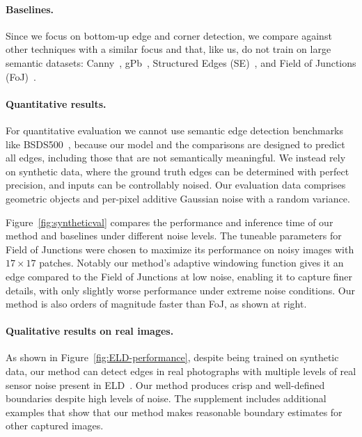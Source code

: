 \documentclass[main.tex]{subfiles}
\begin{document}
\vspace{-5pt}
\paragraph{Baselines.}

Since we focus on bottom-up edge and corner detection, we compare against other techniques with a similar focus and that, like us, do not train on large semantic datasets: Canny~\cite{canny1986computational}, gPb~\cite{4587420}, Structured Edges (SE)~\cite{dollar2014fast}, and Field of Junctions (FoJ)~\cite{verbin2021field}. 

\vspace{-5pt}
\paragraph{Quantitative results.}

For quantitative evaluation we cannot use semantic edge detection benchmarks like BSDS500~\cite{arbelaez2010contour}, because our model and the comparisons are designed to predict all edges, including those that are not semantically meaningful. We instead rely on synthetic data, where the ground truth edges can be determined with perfect precision, and inputs can be controllably noised. Our evaluation data comprises geometric objects and per-pixel additive Gaussian noise with a random variance.

Figure~\ref{fig:syntheticval} compares the performance and inference time of our method and baselines under different noise levels. The tuneable parameters for Field of Junctions were chosen to maximize its performance on noisy images with $17\times 17$ patches. Notably our method's adaptive windowing function gives it an edge compared to the Field of Junctions at low noise, enabling it to capture finer details, with only slightly worse performance under extreme noise conditions. Our method is also orders of magnitude faster than FoJ, as shown at right.

\paragraph{Qualitative results on real images.}
As shown in Figure~\ref{fig:ELD-performance}, despite being trained on synthetic data, our method can detect edges in real photographs with multiple levels of real sensor noise present in ELD~\cite{wei2020physicsbased}. Our method produces crisp and well-defined boundaries despite high levels of noise. The supplement includes additional examples that show that our method makes reasonable boundary estimates for other captured images.
\end{document}
